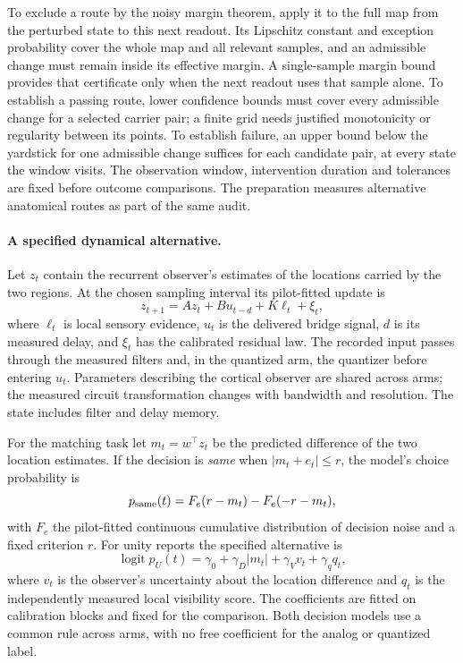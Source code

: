 \documentclass[12pt]{article}
\begin{document}
To exclude a route by the noisy margin theorem, apply it to the full map from
the perturbed state to this next readout. Its Lipschitz constant and exception
probability cover the whole map and all relevant samples, and an admissible
change must remain inside its effective margin. A single-sample margin bound
provides that certificate only when the next readout uses that sample alone.
To establish a passing route, lower confidence bounds must cover every
admissible change for a selected carrier pair; a finite grid needs justified
monotonicity or regularity between its points. To establish failure, an upper
bound below the yardstick for one admissible change suffices for each candidate
pair, at every state the window visits. The observation window, intervention duration and tolerances are fixed
before outcome comparisons. The preparation measures alternative anatomical
routes as part of the same audit.

\paragraph{A specified dynamical alternative.}
Let $z_t$ contain the recurrent observer's estimates of the locations carried
by the two regions. At the chosen sampling interval its pilot-fitted update is
\[
 z_{t+1}=A z_t+B u_{t-d}+K\ell_t+\xi_t ,
\]
where $\ell_t$ is local sensory evidence, $u_t$ is the delivered bridge signal,
$d$ is its measured delay, and $\xi_t$ has the calibrated residual law.
The recorded input passes through the measured filters and, in the quantized
arm, the quantizer before entering $u_t$. Parameters describing the cortical
observer are shared across arms; the measured circuit transformation changes
with bandwidth and resolution. The state includes filter and delay memory.

For the matching task let $m_t=w^\top z_t$ be the predicted difference of the
two location estimates. If the decision is \emph{same} when $|m_t+e_t|\leq r$,
the model's choice probability is
\[
 p_{\rm same}(t)=F_e(r-m_t)-F_e(-r-m_t),
\]
with $F_e$ the pilot-fitted continuous cumulative distribution of decision
noise and a fixed criterion $r$. For unity reports the specified alternative is
\[
 \operatorname{logit} p_U(t)
   =\gamma_0+\gamma_D|m_t|+\gamma_V v_t+\gamma_q q_t ,
\]
where $v_t$ is the observer's uncertainty about the location difference and
$q_t$ is the independently measured local visibility score. The coefficients
are fitted on calibration blocks and fixed for the comparison. Both decision
models use a common rule across arms, with no free coefficient for the analog
or quantized label.
\end{document}
